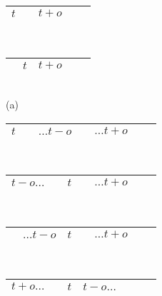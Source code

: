\begin{minipage}[t]{0.5\textwidth}
\begin{center}
\begin{tabular}{ |c|c|c|c|c } 
 \hline
 $t$ & \hspace*{1cm}  & $t + o$ & \hspace*{2cm} \\ 
 \hline
\end{tabular} 
\\
\begin{tabular}{ |c|c|c|c|c }
 \hline 
 \hspace*{1cm} & $t$ & $t + o$ & \hspace*{2cm} \\ 
 \hline
\end{tabular}
\\
(a)
\\[0.1in]
\begin{tabular}{ |c|c|c|c|c|c|c } 
 \hline
 $t$ & \hspace*{0.5cm}  & $\ldots t - o$ & \hspace*{0.5cm} & $\ldots t + o$ & \hspace{0.5cm} \\ 
 \hline
\end{tabular} 
\\
\begin{tabular}{ |c|c|c|c|c|c|c } 
 \hline
 $t-o \ldots$ & \hspace*{0.5cm}  & $t$ & \hspace*{0.5cm} & $\ldots t + o$ & \hspace{0.5cm} \\ 
 \hline
\end{tabular} \\
\begin{tabular}{ |c|c|c|c|c|c|c } 
 \hline
 \hspace*{0.5cm}  & $\ldots t - o$ & $t$ & \hspace*{0.5cm} & $\ldots t + o$ & \hspace{0.5cm} \\ 
 \hline
\end{tabular} \\
\begin{tabular}{ |c|c|c|c|c|c|c } 
 \hline
 $t+o \ldots$ & \hspace*{0.5cm}  & $t$ & $t - o\ldots$ & \hspace*{1cm} \\ 
 \hline
\end{tabular} \\

\end{center}
\end{minipage}
